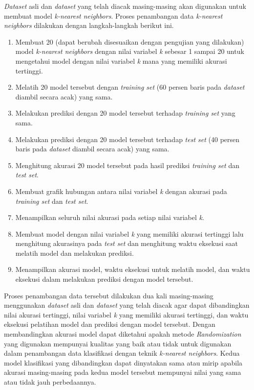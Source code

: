 \textit{Dataset} asli dan \textit{dataset} yang telah diacak masing-masing akan digunakan untuk membuat model \textit{k-nearest neighbors}. Proses penambangan data \textit{k-nearest neighbors} dilakukan dengan langkah-langkah berikut ini.
\begin{enumerate}
    \item Membuat 20 (dapat berubah disesuaikan dengan pengujian yang dilakukan) model \textit{k-nearest neighbors} dengan nilai variabel \textit{k} sebesar 1 sampai 20 untuk mengetahui model dengan nilai variabel \textit{k} mana yang memiliki akurasi tertinggi.
    \item Melatih 20 model tersebut dengan \textit{training set} (60 persen baris pada \textit{dataset} diambil secara acak) yang sama.
    \item Melakukan prediksi dengan 20 model tersebut terhadap \textit{training set} yang sama.
    \item Melakukan prediksi dengan 20 model tersebut terhadap \textit{test set} (40 persen baris pada \textit{dataset} diambil secara acak) yang sama.
    \item Menghitung akurasi 20 model tersebut pada hasil prediksi \textit{training set} dan \textit{test set}.
    \item Membuat grafik hubungan antara nilai variabel \textit{k} dengan akurasi pada \textit{training set} dan \textit{test set}.
    \item Menampilkan seluruh nilai akurasi pada setiap nilai variabel \textit{k}.
    \item Membuat model dengan nilai variabel \textit{k} yang memiliki akurasi tertinggi lalu menghitung akurasinya pada \textit{test set} dan menghitung waktu eksekusi saat melatih model dan melakukan prediksi.
    \item Menampilkan akurasi model, waktu eksekusi untuk melatih model, dan waktu eksekusi dalam melakukan prediksi dengan model tersebut.
\end{enumerate}
Proses penambangan data tersebut dilakukan dua kali masing-masing menggunakan \textit{dataset} asli dan \textit{dataset} yang telah diacak agar dapat dibandingkan nilai akurasi tertinggi, nilai variabel \textit{k} yang memiliki akurasi tertinggi, dan waktu eksekusi pelatihan model dan prediksi dengan model tersebut. Dengan membandingkan akurasi model dapat diketahui apakah metode \textit{Randomization} yang digunakan mempunyai kualitas yang baik atau tidak untuk digunakan dalam penambangan data klasifikasi dengan teknik \textit{k-nearest neighbors}. Kedua model klasifikasi yang dibandingkan dapat dinyatakan sama atau mirip apabila akurasi masing-masing pada kedua model tersebut mempunyai nilai yang sama atau tidak jauh perbedaannya.


